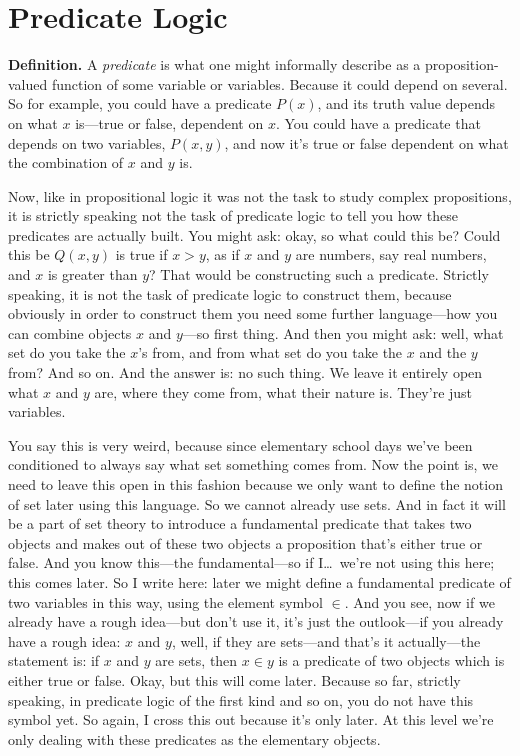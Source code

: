 \section{Predicate Logic}

\textbf{Definition.} A \emph{predicate} is what one might informally describe as a proposition-valued function of some variable or variables. Because it could depend on several. So for example, you could have a predicate $P(x)$, and its truth value depends on what $x$ is---true or false, dependent on $x$. You could have a predicate that depends on two variables, $P(x, y)$, and now it's true or false dependent on what the combination of $x$ and $y$ is.

Now, like in propositional logic it was not the task to study complex propositions, it is strictly speaking not the task of predicate logic to tell you how these predicates are actually built. You might ask: okay, so what could this be? Could this be $Q(x, y)$ is true if $x > y$, as if $x$ and $y$ are numbers, say real numbers, and $x$ is greater than $y$? That would be constructing such a predicate. Strictly speaking, it is not the task of predicate logic to construct them, because obviously in order to construct them you need some further language---how you can combine objects $x$ and $y$---so first thing. And then you might ask: well, what set do you take the $x$'s from, and from what set do you take the $x$ and the $y$ from? And so on. And the answer is: no such thing. We leave it entirely open what $x$ and $y$ are, where they come from, what their nature is. They're just variables.

You say this is very weird, because since elementary school days we've been conditioned to always say what set something comes from. Now the point is, we need to leave this open in this fashion because we only want to define the notion of set later using this language. So we cannot already use sets. And in fact it will be a part of set theory to introduce a fundamental predicate that takes two objects and makes out of these two objects a proposition that's either true or false. And you know this---the fundamental---so if I\ldots\ we're not using this here; this comes later. So I write here: later we might define a fundamental predicate of two variables in this way, using the element symbol $\in$. And you see, now if we already have a rough idea---but don't use it, it's just the outlook---if you already have a rough idea: $x$ and $y$, well, if they are sets---and that's it actually---the statement is: if $x$ and $y$ are sets, then $x \in y$ is a predicate of two objects which is either true or false. Okay, but this will come later. Because so far, strictly speaking, in predicate logic of the first kind and so on, you do not have this symbol yet. So again, I cross this out because it's only later. At this level we're only dealing with these predicates as the elementary objects.

